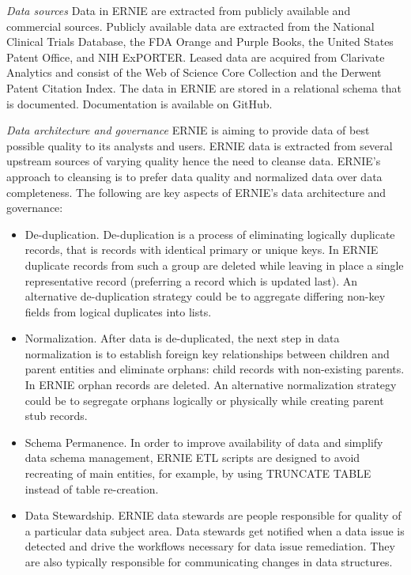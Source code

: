 \documentclass[review]{elsarticle}
\begin{document}
\emph{Data sources} Data in ERNIE are extracted from publicly available and commercial sources. Publicly available data are extracted from the National Clinical Trials Database, the FDA Orange and Purple Books, the United States Patent Office, and NIH ExPORTER. Leased data are acquired from Clarivate Analytics and consist of the Web of Science Core Collection and the Derwent Patent Citation Index. The data in ERNIE are stored in a relational schema that is documented. Documentation is available on GitHub.

\emph{Data architecture and governance} ERNIE is aiming to provide data of best possible quality to
its analysts and users.
ERNIE data is extracted from several upstream sources of varying quality hence the need to cleanse
data.
ERNIE's approach to cleansing is to prefer data quality and normalized data over data completeness.
The following are key aspects of ERNIE's data architecture and governance:
\begin{itemize}
  \item De-duplication.
De-duplication is a process of eliminating logically duplicate records, that is records with
identical primary or unique keys.
In ERNIE duplicate records from such a group are deleted while leaving in place a single
representative record (preferring a record which is updated last).
An alternative de-duplication strategy could be to aggregate differing non-key fields from logical
duplicates into lists.
  \item Normalization.
After data is de-duplicated, the next step in data normalization is to establish foreign key
relationships between children and parent entities and eliminate orphans: child records with
non-existing parents.
In ERNIE orphan records are deleted.
An alternative normalization strategy could be to segregate orphans logically or physically while
creating parent stub records.
  \item Schema Permanence.
In order to improve availability of data and simplify data schema management, ERNIE ETL scripts are
designed to avoid recreating of main entities, for example, by using TRUNCATE TABLE instead of table re-creation.
  \item Data Stewardship.
ERNIE data stewards are people responsible for quality of a particular data subject area.
Data stewards get notified when a data issue is detected and drive the workflows necessary for data
issue remediation.
They are also typically responsible for communicating changes in data structures.
\end{itemize}
\end{document}
